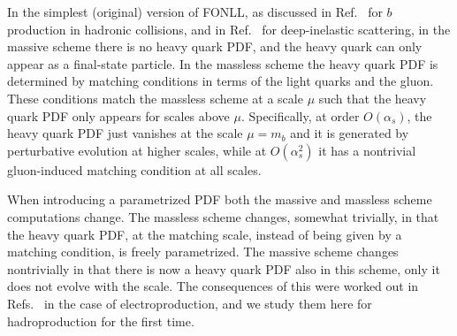 In the simplest (original) version of  FONLL, as discussed
in Ref.~\cite{Cacciari:1998it} for $b$ production in hadronic
collisions, and in Ref.~\cite{Forte:2010ta} for deep-inelastic
scattering, in the massive scheme there is no heavy quark PDF, and the
 heavy quark can only appear as a final-state particle. In the
 massless scheme the heavy quark PDF is determined by matching
 conditions in terms of the light quarks and the gluon. These
 conditions match the massless scheme at a scale $\mu$ such that the
 heavy quark PDF only appears for scales above $\mu$. Specifically,
 at order $O(\alpha_s)$, the heavy quark PDF just vanishes
 at the scale 
 $\mu=m_b$
 and it is
 generated by perturbative evolution at higher scales, while at
 $O(\alpha^2_s)$ it has a nontrivial gluon-induced matching condition
 at all scales.

 When introducing a parametrized PDF both the massive and massless
 scheme computations change. The massless scheme changes, somewhat
 trivially,
 in that the
 heavy quark PDF, at the matching scale, instead of being given by a
 matching condition,  is freely parametrized. The massive scheme
 changes nontrivially in that there is now a heavy quark PDF also in
 this scheme, 
only it does not evolve with the scale.  The
 consequences of this were worked out in
 Refs.~\cite{Ball:2015tna,Ball:2015dpa} in the case of
 electroproduction, and we study them here for hadroproduction for the
 first time.

